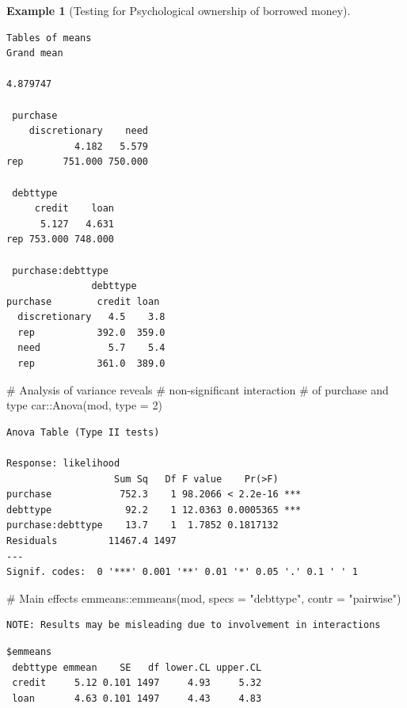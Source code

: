 \documentclass[
  11pt,
  letterpaper,
]{scrbook}
\newenvironment{Shaded}{\begin{snugshade}}{\end{snugshade}}
\newcommand{\AttributeTok}[1]{\textcolor[rgb]{0.40,0.45,0.13}{#1}}
\newcommand{\CommentTok}[1]{\textcolor[rgb]{0.37,0.37,0.37}{#1}}
\newcommand{\DecValTok}[1]{\textcolor[rgb]{0.68,0.00,0.00}{#1}}
\newcommand{\FunctionTok}[1]{\textcolor[rgb]{0.28,0.35,0.67}{#1}}
\newcommand{\NormalTok}[1]{\textcolor[rgb]{0.00,0.23,0.31}{#1}}
\newcommand{\SpecialCharTok}[1]{\textcolor[rgb]{0.37,0.37,0.37}{#1}}
\newcommand{\StringTok}[1]{\textcolor[rgb]{0.13,0.47,0.30}{#1}}
\theoremstyle{definition}
\newtheorem{example}{Example}[chapter]
\theoremstyle{definition}
\theoremstyle{remark}
\begin{document}
\begin{example}[Testing for Psychological ownership of borrowed
money]
\begin{verbatim}
Tables of means
Grand mean
         
4.879747 

 purchase 
    discretionary    need
            4.182   5.579
rep       751.000 750.000

 debttype 
     credit    loan
      5.127   4.631
rep 753.000 748.000

 purchase:debttype 
               debttype
purchase        credit loan 
  discretionary   4.5    3.8
  rep           392.0  359.0
  need            5.7    5.4
  rep           361.0  389.0
\end{verbatim}

\begin{Shaded}
\begin{Highlighting}[]
\CommentTok{\# Analysis of variance reveals }
\CommentTok{\# non{-}significant interaction}
\CommentTok{\# of purchase and type}
\NormalTok{car}\SpecialCharTok{::}\FunctionTok{Anova}\NormalTok{(mod, }\AttributeTok{type =} \DecValTok{2}\NormalTok{)}
\end{Highlighting}
\end{Shaded}

\begin{verbatim}
Anova Table (Type II tests)

Response: likelihood
                   Sum Sq   Df F value    Pr(>F)    
purchase            752.3    1 98.2066 < 2.2e-16 ***
debttype             92.2    1 12.0363 0.0005365 ***
purchase:debttype    13.7    1  1.7852 0.1817132    
Residuals         11467.4 1497                      
---
Signif. codes:  0 '***' 0.001 '**' 0.01 '*' 0.05 '.' 0.1 ' ' 1
\end{verbatim}

\begin{Shaded}
\begin{Highlighting}[]
\CommentTok{\# Main effects}
\NormalTok{emmeans}\SpecialCharTok{::}\FunctionTok{emmeans}\NormalTok{(mod, }
                 \AttributeTok{specs =} \StringTok{"debttype"}\NormalTok{,}
                 \AttributeTok{contr =} \StringTok{"pairwise"}\NormalTok{)}
\end{Highlighting}
\end{Shaded}

\begin{verbatim}
NOTE: Results may be misleading due to involvement in interactions
\end{verbatim}

\begin{verbatim}
$emmeans
 debttype emmean    SE   df lower.CL upper.CL
 credit     5.12 0.101 1497     4.93     5.32
 loan       4.63 0.101 1497     4.43     4.83


\end{verbatim}
\end{example}
\end{document}
